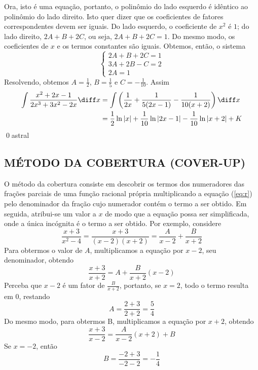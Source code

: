 \documentclass[a4paper, 12pt]{extreport}
\begin{document}
        Ora, isto é uma equação, portanto, o polinômio do lado esquerdo é idêntico ao polinômio do lado direito. Isto quer dizer que os coeficientes
        de fatores correspondentes devem ser iguais. Do lado esquerdo, o coeficiente de $x^2$ é $1$; do lado direito, $2A+B+2C$, ou seja, $2A+B+2C = 1$.
        Do mesmo modo, os coeficientes de $x$ e os termos constantes são iguais. Obtemos, então, o sistema
        \begin{equation*}
          \begin{cases}
            2A+B+2C = 1 \\
            3A+2B-C = 2 \\
            2A = 1
          \end{cases}
        \end{equation*}
        Resolvendo, obtemos $A = \frac{1}{2}$, $B = \frac{1}{5}$ e $C = -\frac{1}{10}$. Assim
        \begin{equation*}
          \begin{split}
            \int{\frac{x^2+2x-1}{2x^3+3x^2-2x}\diff x} & = \int{\left(\frac{1}{2x} + \frac{1}{5(2x-1)} - \frac{1}{10(x+2)}\right)\diff x} \\
                                                  & = \frac{1}{2}\ln|x| + \frac{1}{10}\ln|2x-1| - \frac{1}{10}\ln|x+2| + K
          \end{split}
        \end{equation*}
        \qed{astral}

        \subsection*{\color{coverup}\small MÉTODO DA COBERTURA (COVER-UP)}
          O método da cobertura consiste em descobrir os termos dos numeradores das frações parciais de uma função racional própria multiplicando
          a equação (\ref{eq:r}) pelo denominador da fração cujo numerador contém o termo a ser obtido. Em seguida, atribui-se um valor a $x$ de modo que
          a equação possa ser simplificada, onde a única incógnita é o termo a ser obtido.
          Por exemplo, considere $$ \frac{x+3}{x^2-4} = \frac{x+3}{(x-2)(x+2)} = \frac{A}{x-2} + \frac{B}{x+2} $$
          Para obtermos o valor de $A$, multiplicamos a equação por $x-2$, seu denominador, obtendo
          $$ \frac{x+3}{x+2} = A + \frac{B}{x+2}(x-2) $$
          Perceba que $x-2$ é um fator de {\large$\frac{B}{x+2}$}, portanto, se $x=2$, todo o termo resulta em $0$, restando
          $$ A = \frac{2+3}{2+2} = \frac{5}{4} $$
          Do mesmo modo, para obtermos B, multiplicamos a equação por $x+2$, obtendo
          $$ \frac{x+3}{x-2} = \frac{A}{x-2}(x+2) + B $$
          Se $x = -2$, então
          $$ B = \frac{-2+3}{-2-2} = -\frac{1}{4} $$
\end{document}
